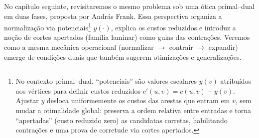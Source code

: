 No capítulo seguinte, revisitaremos o mesmo problema sob uma ótica primal–dual em duas fases, proposta por András Frank. Essa perspectiva organiza a normalização via potenciais\footnote{No contexto primal–dual, “potenciais” são valores escalares \(y(v)\) atribuídos aos vértices para definir custos reduzidos \(c'(u,v)=c(u,v)-y(v)\). Ajustar \(y\) desloca uniformemente os custos das arestas que entram em \(v\), sem mudar a otimalidade global: preserva a ordem relativa entre entradas e torna “apertadas” (custo reduzido zero) as candidatas corretas, habilitando contrações e uma prova de corretude via cortes apertados.} \(y(\cdot)\), explica os custos reduzidos e introduz a noção de cortes apertados (família laminar) como guias das contrações. Veremos como a mesma mecânica operacional (normalizar \(\to\) contrair \(\to\) expandir) emerge de condições duais que também sugerem otimizações e generalizações.
